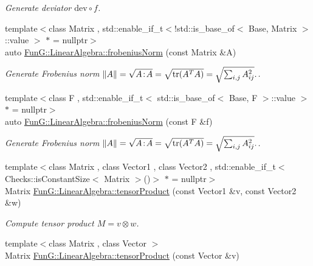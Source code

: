 \begin{DoxyCompactItemize}
\begin{DoxyCompactList}\small\item\em Generate deviator $ \mathrm{dev}\circ f$. \end{DoxyCompactList}\item 
\hypertarget{group__LinearAlgebraGroup_gaa893e7d667dde98d2b119ca004745186}{{\footnotesize template$<$class Matrix , std\-::enable\-\_\-if\-\_\-t$<$!std\-::is\-\_\-base\-\_\-of$<$ Base, Matrix $>$\-::value $>$ $\ast$  = nullptr$>$ }\\auto \hyperlink{group__LinearAlgebraGroup_gaa893e7d667dde98d2b119ca004745186}{Fun\-G\-::\-Linear\-Algebra\-::frobenius\-Norm} (const Matrix \&A)}\label{group__LinearAlgebraGroup_gaa893e7d667dde98d2b119ca004745186}

\begin{DoxyCompactList}\small\item\em Generate Frobenius norm $ \|A\| = \sqrt{A\negthinspace : \negthinspace A }= \sqrt{\mathrm{tr}(A^TA)} = \sqrt{\sum_{i,j} A_{ij}^2}. $. \end{DoxyCompactList}\item 
\hypertarget{group__LinearAlgebraGroup_gafa2f358f9310cecb787620ad8ec460a6}{{\footnotesize template$<$class F , std\-::enable\-\_\-if\-\_\-t$<$ std\-::is\-\_\-base\-\_\-of$<$ Base, F $>$\-::value $>$ $\ast$  = nullptr$>$ }\\auto \hyperlink{group__LinearAlgebraGroup_gafa2f358f9310cecb787620ad8ec460a6}{Fun\-G\-::\-Linear\-Algebra\-::frobenius\-Norm} (const F \&f)}\label{group__LinearAlgebraGroup_gafa2f358f9310cecb787620ad8ec460a6}

\begin{DoxyCompactList}\small\item\em Generate Frobenius norm $ \|A\| = \sqrt{A\negthinspace : \negthinspace A }= \sqrt{\mathrm{tr}(A^TA)} = \sqrt{\sum_{i,j} A_{ij}^2}. $. \end{DoxyCompactList}\item 
\hypertarget{group__LinearAlgebraGroup_ga5d0e066e6184fb3324d96d20087b5578}{{\footnotesize template$<$class Matrix , class Vector1 , class Vector2 , std\-::enable\-\_\-if\-\_\-t$<$ Checks\-::is\-Constant\-Size$<$ Matrix $>$()$>$ $\ast$  = nullptr$>$ }\\Matrix \hyperlink{group__LinearAlgebraGroup_ga5d0e066e6184fb3324d96d20087b5578}{Fun\-G\-::\-Linear\-Algebra\-::tensor\-Product} (const Vector1 \&v, const Vector2 \&w)}\label{group__LinearAlgebraGroup_ga5d0e066e6184fb3324d96d20087b5578}

\begin{DoxyCompactList}\small\item\em Compute tensor product $ M = v \otimes w $. \end{DoxyCompactList}\item 
\hypertarget{group__LinearAlgebraGroup_gae5e82b9e66319511dae5ff0d9304a6b7}{{\footnotesize template$<$class Matrix , class Vector $>$ }\\Matrix \hyperlink{group__LinearAlgebraGroup_gae5e82b9e66319511dae5ff0d9304a6b7}{Fun\-G\-::\-Linear\-Algebra\-::tensor\-Product} (const Vector \&v)}\label{group__LinearAlgebraGroup_gae5e82b9e66319511dae5ff0d9304a6b7}


\end{DoxyCompactItemize}
